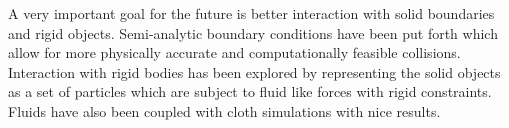 A very important goal for the future is better interaction with solid
boundaries and rigid objects. Semi-analytic boundary conditions have been put
forth which allow for more physically accurate and computationally feasible
collisions.\cite{Manenti2011} \cite{Harada2007}
Interaction with rigid bodies has been explored by representing the solid
objects as a set of particles which are subject to fluid like forces with rigid
constraints.\cite{Harada2007c} Fluids have also been coupled with cloth simulations with nice results.\cite{Harada2007b}



